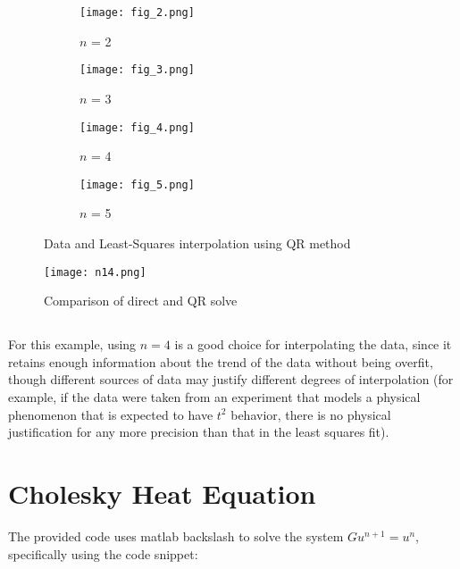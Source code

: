 \documentclass{template}
\begin{document}
\begin{figure}[h]
    \centering
    \begin{subfigure}{0.48\textwidth}
        \texttt{[image: fig\_2.png]}
        \caption{$n$ = 2}
        \label{}
    \end{subfigure}
    \begin{subfigure}{0.48\textwidth}
        \texttt{[image: fig\_3.png]}
        \caption{$n$ = 3}
        \label{}
    \end{subfigure}

    \begin{subfigure}{0.48\textwidth}
        \texttt{[image: fig\_4.png]}
        \caption{$n$ = 4}
        \label{}
    \end{subfigure}
    \begin{subfigure}{0.48\textwidth}
        \texttt{[image: fig\_5.png]}
        \caption{$n$ = 5}
        \label{}
    \end{subfigure}
    \caption{Data and Least-Squares interpolation using QR method}
    \label{fig:increasing-n}
\end{figure}


\begin{figure}[h]
  \centering
  \texttt{[image: n14.png]}
  \caption{Comparison of direct and QR solve}
  \label{fig:method-comparison}
\end{figure}

\subsection{}

For this example, using $n=4$ is a good choice for interpolating the data, since it retains enough information about the trend of the data without being overfit, though different sources of data may justify different degrees of interpolation (for example, if the data were taken from an experiment that models a physical phenomenon that is expected to have $t^2$ behavior, there is no physical justification for any more precision than that in the least squares fit).


\section{Cholesky Heat Equation}

The provided code uses matlab backslash to solve the system $Gu^{n+1} = u^n$, specifically using the code snippet:
\end{document}
